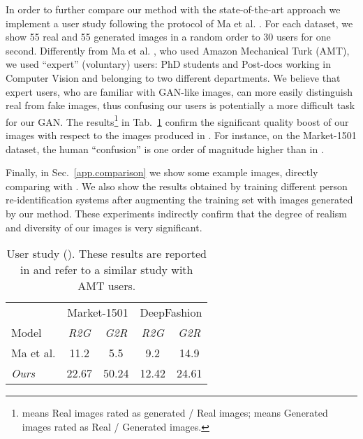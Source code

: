 \documentclass[10pt,twocolumn,letterpaper]{article}
\begin{document}
In order to further compare our method with the state-of-the-art approach \cite{ma2017pose} 
 we implement a user study 
following the protocol of Ma et al. \cite{ma2017pose}. For each dataset, we show
55 real  and 55 generated images in a random order to 30 users for one second.
Differently from Ma et al. \cite{ma2017pose}, who used Amazon Mechanical Turk (AMT),
we used 
 ``expert'' (voluntary) users: PhD students and Post-docs working in Computer Vision and belonging to two different departments.
 We believe that expert users, who are familiar with GAN-like images,
 can more easily 
 distinguish  real  from fake images,  thus confusing our users is potentially a more difficult task for our GAN.
The results\footnote{ means Real images rated as generated / Real images; 
 means Generated images rated as Real / Generated images.}  in 
Tab.~\ref{tab:user-study} 
confirm the significant  quality boost of our images with respect to the images produced in
\cite{ma2017pose}. For instance, on the  Market-1501 dataset, the  human ``confusion'' is one order of magnitude higher than in \cite{ma2017pose}.

Finally, in Sec.~\ref{app.comparison} we show some example images, directly comparing with \cite{ma2017pose}.  We also show the results obtained 
by training different person re-identification systems  after augmenting the training set with images generated by our  method. These experiments indirectly confirm that the degree of realism and diversity of our images is very significant.


\begin{table}[h!]
\caption{User study ().
 These results are reported in \cite{ma2017pose} and refer to a similar study with AMT users. } 
\centering
\begin{tabular}{l|cc|cc}
  \hline
  &\multicolumn{2}{c|}{Market-1501}&\multicolumn{2}{c}{DeepFashion}\\
 Model &\emph{R2G} & \emph{G2R} & \emph{R2G} & \emph{G2R} \\
\hline
Ma et al. \cite{ma2017pose}           & 11.2       & 5.5        & 9.2       & 14.9 \\
\emph{Ours}             & 22.67     & 50.24  &  12.42   & 24.61 \\
\hline
\end{tabular}
\label{tab:user-study}
\end{table}
\end{document}
